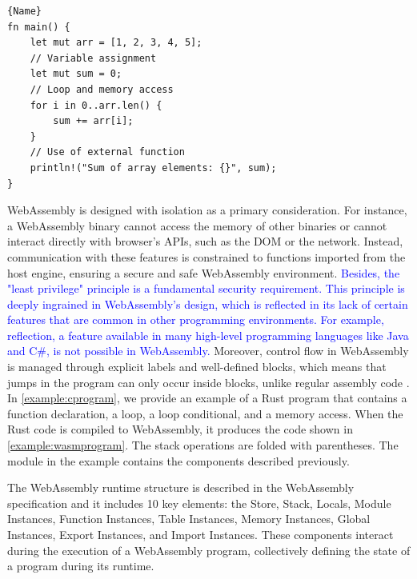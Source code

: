 \documentclass[a4paper,fleqn]{cas-dc}
\newcommand*\badge[1]{ \colorbox{red}{\color{white}#1}}
\newcommand{\Wasm}{WebAssembly\xspace}
\newcommand{\revision}[1]{\textcolor{blue}{#1}}
\newcommand{\todo}[1]{%
\refstepcounter{todo}
\noindent\textbf{\badge{TODO}} {\color{red}#1}
\addcontentsline{td}{todo}
{\color{red}\thesection.\thetodo\xspace #1}}
\begin{document}
{
\begin{lstlisting}[label=example:cprogram,caption={A Rust program containing function declaration, loop, conditional and memory access.},captionpos=b]{Name}
fn main() {
    let mut arr = [1, 2, 3, 4, 5];
    // Variable assignment
    let mut sum = 0;
    // Loop and memory access
    for i in 0..arr.len() {
        sum += arr[i];
    }
    // Use of external function
    println!("Sum of array elements: {}", sum);
}
\end{lstlisting}   
}





WebAssembly is designed with isolation as a primary consideration. 
For instance, a WebAssembly binary cannot access the memory of other binaries or cannot interact directly with browser's APIs, such as the DOM or the network. Instead, communication with these features is constrained to functions imported from the host engine, ensuring a secure and safe WebAssembly environment.
\revision{
Besides, the "least privilege" principle is a fundamental security requirement. 
This principle is deeply ingrained in WebAssembly’s design, which is reflected in its lack of certain features that are common in other programming environments.
For example, reflection, a feature available in many high-level programming languages like Java and C\#, is not possible in \Wasm. 
}
Moreover, control flow in WebAssembly is managed through explicit labels and well-defined blocks, which means that jumps in the program can only occur inside blocks, unlike regular assembly code \cite{10.1145/3062341.3062363}. 
In \autoref{example:cprogram}, we provide an example of a Rust program that contains a function declaration, a loop, a loop conditional, and a memory access. When the Rust code is compiled to WebAssembly, it produces the code shown in \autoref{example:wasmprogram}. The stack operations are folded with parentheses.
The module in the example contains the components described previously.




The WebAssembly runtime structure is described in the WebAssembly specification and it includes 10 key elements: the Store, Stack, Locals, Module Instances, Function Instances, Table Instances, Memory Instances, Global Instances, Export Instances, and Import Instances. These components interact during the execution of a WebAssembly program, collectively defining the state of a program during its runtime.
\end{document}
